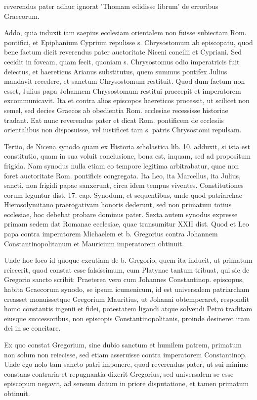 reverendus pater adhuc ignorat 'Thomam edidisse librum' de erroribus Graecorum.

Addo, quia induxit iam saepius ecclesiam orientalem non fuisse subiectam Rom. pontifici, et Epiphanium Cyprium repulisse s. Chrysostomum ab episcopatu, quod bene factum dicit reverendus pater auctoritate Niceni concilii et Cypriani. Sed cecidit in foveam, quam fecit, quoniam s. Chrysostomus odio imperatricis fuit deiectus, et haereticus Arianus substitutus, quem summus pontifex Julius mandavit recedere, et sanctum Chrysostomum restituit. Quod dum factum non esset, Julius papa Johannem Chrysostomum restitui praecepit et imperatorem excommunicavit. Ita et contra alios episcopos haereticos processit, ut scilicet non semel, sed decies Graecos ab obedientia Rom. ecclesiae recessisse \marginpar{\small[291]} historiae tradant. Eat nunc reverendus pater et dicat Rom. pontificem de ecclesiis orientalibus non disposuisse, vel iustificet tam s. patris Chrysostomi repulsam.

Tertio, de Nicena synodo quam ex Historia scholastica lib. 10. adduxit, si ista est constitutio, quam in sua voluit conclusione, bona est, inquam, sed ad propositum frigida. Nam synodus nulla etiam eo tempore legitima arbitrabatur, quae non foret auctoritate Rom. pontificis congregata. Ita Leo, ita Marcellus, ita Julius, sancti, non frigidi papae sanxerunt, circa idem tempus viventes. Constitutiones eorum leguntur dist. 17. cap. Synodum, et sequentibus, unde quod patriarchae Hierosolymitano praerogativam honoris dederunt, sed non primatum totius ecclesiae, hoc debebat probare dominus pater. Sexta autem synodus expresse primam sedem dat Romanae ecclesiae, quae transumitur XXII dist. Quod et Leo papa contra imperatorem Michaelem et b. Gregorius contra Johannem Constantinopolitanum et Mauricium imperatorem obtinuit.

Unde hoc loco id quoque excutiam de b. Gregorio, quem ita inducit, ut primatum reiecerit, quod constat esse falsissimum, cum Platynae tantum tribuat, qui sic de Gregorio sancto scribit: Praeterea vero cum Johannes Constantinop. episcopus, habita Graecorum synodo, se ipsum icumenicum, id est universalem patriarcham creasset monuissetque Gregorium Mauritius, ut Johanni obtemperaret, respondit homo constantis ingenii et fidei, potestatem ligandi atque solvendi Petro traditam eiusque successoribus, non episcopis Constantinopolitanis, proinde desineret iram dei in se concitare.

Ex quo constat Gregorium, sine dubio sanctum et humilem patrem, primatum non solum non reiecisse, sed etiam asseruisse contra imperatorem Constantinop. Unde ego nolo tam sancto patri imponere, quod reverendus pater, ut sui minime constans contraria et repugnantia dixerit Gregorius, sed universalem se esse episcopum negavit, ad sensum datum in priore disputatione, et tamen primatum obtinuit.


